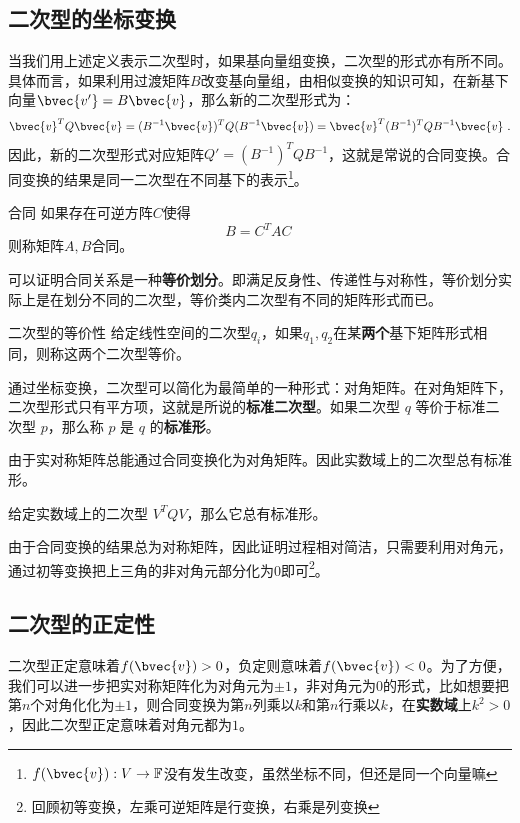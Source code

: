 \subsection{二次型的坐标变换}
当我们用上述定义表示二次型时，如果基向量组变换，二次型的形式亦有所不同。具体而言，如果利用过渡矩阵$B$改变基向量组，由相似变换的知识可知，在新基下向量$\bvec{v'}=B\bvec{v}$，那么新的二次型形式为：
\begin{equation}
\bvec{v}^T Q\bvec{v}=(B^{-1}\bvec{v})^T Q(B^{-1}\bvec{v})=\bvec{v}^T (B^{-1})^{T}QB^{-1}\bvec{v}~.
\end{equation}
因此，新的二次型形式对应矩阵$Q'=(B^{-1})^{T}QB^{-1}$，这就是常说的合同变换。合同变换的结果是同一二次型在不同基下的表示\footnote{$f(\bvec{v}):V\rightarrow \mathbb F$没有发生改变，虽然坐标不同，但还是同一个向量嘛}。
\begin{definition}{合同}
如果存在可逆方阵$C$使得
\begin{equation}
B=C^T AC~
\end{equation}
则称矩阵$A,B$合同。
\end{definition}
可以证明合同关系是一种\textbf{等价划分}。即满足反身性、传递性与对称性，等价划分实际上是在划分不同的二次型，等价类内二次型有不同的矩阵形式而已。

\begin{definition}{二次型的等价性}
给定线性空间的二次型$q_i$，如果$q_1,q_2$在某\textbf{两个}基下矩阵形式相同，则称这两个二次型等价。
\end{definition}

通过坐标变换，二次型可以简化为最简单的一种形式：对角矩阵。在对角矩阵下，二次型形式只有平方项，这就是所说的\textbf{标准二次型}。如果二次型 $q$
等价于标准二次型 $p$，那么称 $p$ 是 $q$ 的\textbf{标准形}。

由于实对称矩阵总能通过合同变换化为对角矩阵。因此实数域上的二次型总有标准形。
\begin{theorem}{}
给定实数域上的二次型 $V^T QV$，那么它总有标准形。
\end{theorem}
由于合同变换的结果总为对称矩阵，因此证明过程相对简洁，只需要利用对角元，通过初等变换把上三角的非对角元部分化为0即可\footnote{回顾初等变换，左乘可逆矩阵是行变换，右乘是列变换}。
\subsection{二次型的正定性}
二次型正定意味着$f(\bvec{v})>0$，负定则意味着$f(\bvec{v})< 0$。为了方便，我们可以进一步把实对称矩阵化为对角元为$\pm 1$，非对角元为$0$的形式，比如想要把第$n$个对角化化为$\pm 1$，则合同变换为第$n$列乘以$k$和第$n$行乘以$k$，在\textbf{实数域}上$k^2>0$，因此二次型正定意味着对角元都为$1$。

